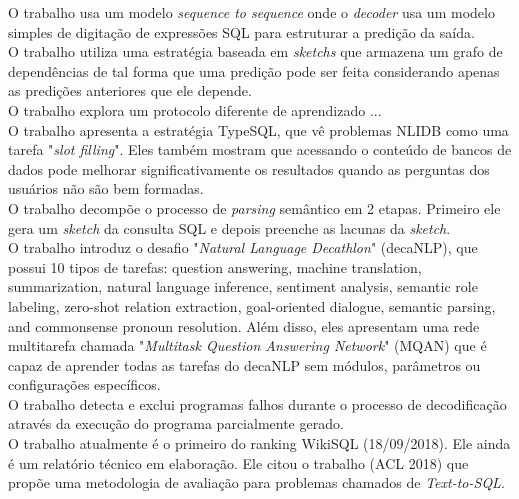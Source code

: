 \documentclass{article}
\begin{document}
O trabalho \citep{wang2018pointing} usa um modelo \textit{sequence to sequence} onde o \textit{decoder} usa um modelo simples de digitação de expressões SQL para estruturar a predição da saída. \\

O trabalho \citep{xu2017sqlnet} utiliza uma estratégia baseada em \textit{sketchs} que armazena um grafo de dependências de tal forma que uma predição pode ser feita considerando apenas as predições anteriores que ele depende. \\

O trabalho \citep{huang2018natural} explora um protocolo diferente de aprendizado ... \\

O trabalho \citep{yu2018typesql} apresenta a estratégia TypeSQL, que vê problemas NLIDB como uma tarefa "\textit{slot filling}". Eles também mostram que acessando o conteúdo de bancos de dados pode melhorar significativamente os resultados quando as perguntas dos usuários não são bem formadas. \\

O trabalho \citep{dong2018coarse} decompõe o processo de \textit{parsing} semântico em 2 etapas. Primeiro ele gera um \textit{sketch} da consulta SQL e depois preenche as lacunas da \textit{sketch}. \\

O trabalho \cite{mccann2018natural} introduz o desafio "\textit{Natural Language Decathlon}" (decaNLP), que possui 10 tipos de tarefas: question answering, machine translation, summarization, natural language inference, sentiment analysis, semantic role labeling, zero-shot relation extraction, goal-oriented dialogue, semantic parsing, and commonsense pronoun resolution. Além disso, eles apresentam uma rede multitarefa chamada "\textit{Multitask Question Answering Network}" (MQAN) que é capaz de aprender todas as tarefas do decaNLP sem módulos, parâmetros ou configurações específicos. \\

O trabalho \citep{2018arXiv180703100W} detecta e exclui programas falhos durante o processo de decodificação através da execução do programa parcialmente gerado. \\

O trabalho \citep{shi2018incsql} atualmente é o primeiro do ranking WikiSQL (18/09/2018). Ele ainda é um relatório técnico em elaboração. Ele citou o trabalho \citep{finegan2018improving} (ACL 2018) que propõe uma metodologia de avaliação para problemas chamados de \textit{Text-to-SQL}.\\
\end{document}
